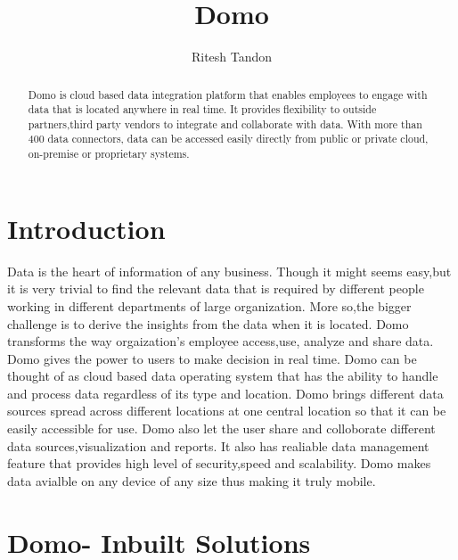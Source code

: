 
\title{Domo}

\author{Ritesh Tandon}


\renewcommand{\shortauthors}{R. Tandon}


\begin{abstract}
Domo is cloud based data integration platform that enables employees 
to engage with data that is located anywhere in real time. 
It provides flexibility to outside partners,third party vendors to 
integrate and collaborate with data. With more than 400 data connectors,
data can be accessed easily directly from public or private cloud,
on-premise or proprietary systems.
\end{abstract}


\maketitle


\section{Introduction}

Data is the heart of information of any business. 
Though it might seems easy,but it is very trivial 
to find the relevant data that is required by different 
people working in different departments of large organization. 
More so,the bigger challenge is to derive the insights 
from the data when it is located.
Domo transforms the way orgaization's employee access,use,
analyze and share data. Domo gives the power to users to 
make decision in real time. Domo can be thought of as cloud 
based data operating system that has the ability to handle 
and process data regardless of its type and location. 
Domo brings different data sources spread across different 
locations at one central location so that it can be easily 
accessible for use. Domo also let the user share and 
colloborate different data sources,visualization and 
reports. It also has realiable data management feature 
that provides high level of security,speed and scalability. 
Domo makes data avialble on any device of any size thus 
making it truly mobile.

\section{Domo- Inbuilt Solutions}

